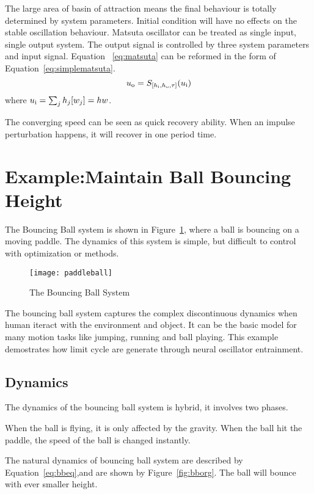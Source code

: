 The large area of basin of attraction means the final behaviour is totally determined by system parameters. 
Initial condition will have no effects on the stable oscillation behaviour. 
Matsuta oscillator can be treated as single input, single output system.
The output signal is controlled by three system parameters and input signal. 
Equation ~\ref{eq:matsuta} can be reformed in the form of Equation~\ref{eq:simplematsuta}.
\begin{equation}
\label{eq:simplematsuta}
u_{\mathrm{o}}=S_{[h_{\mathrm{i}},h_{\mathrm{o}},\tau]}(u_{\mathrm{i}})
\end{equation}
where $u_{\mathrm{i}}=\sum_{j}h_{j}[w_{j}]=hw$.





The converging speed can be seen as quick recovery ability.
When an impulse perturbation happens, it will recover in one period time.


\section{Example:Maintain Ball Bouncing Height}

The Bouncing Ball system is shown in Figure~\ref{fig:bball}, where a ball is bouncing on a moving paddle.
The dynamics of this system is simple, but difficult to control with optimization or \pd methods.
\begin{figure}
\begin{center}
\texttt{[image: paddleball]}
\end{center}
\caption{The Bouncing Ball System}
\label{fig:bball}
\end{figure}
 
The bouncing ball system captures the complex discontinuous dynamics when human iteract with the environment and object. 
It can be the basic model for many motion tasks like jumping, running and ball playing.
This example demostrates how limit cycle are generate through neural  oscillator entrainment.
 
\subsection*{Dynamics}
The dynamics of the bouncing ball system is hybrid, it involves two phases.
\begin{itemize}
When the ball is flying, it is only affected by the gravity.
When the ball hit the paddle, the speed of the ball is changed instantly.
\end{itemize}
The natural dynamics of bouncing ball system are described by  Equation~\ref{eq:bbeq},and are shown by Figure~\ref{fig:bborg}. 
The ball will  bounce with ever smaller height. 

